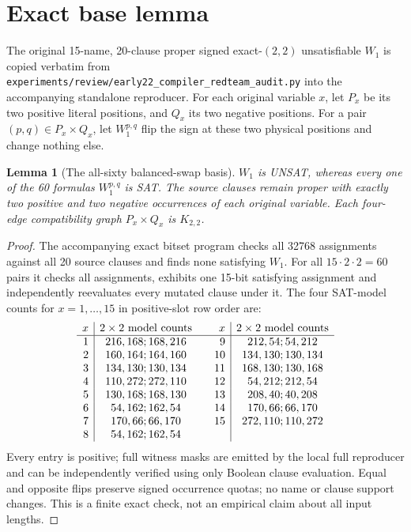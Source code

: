 \documentclass[11pt]{article}
\newtheorem{lemma}[theorem]{Lemma}
\begin{document}
\section{Exact base lemma}
The original 15-name, 20-clause proper signed exact-$(2,2)$ unsatisfiable
$W_1$ is copied verbatim from
\texttt{experiments/review/early22\_compiler\_redteam\_audit.py}
into the accompanying standalone reproducer.
For each original variable $x$, let $P_x$ be its two positive literal
positions, and $Q_x$ its two negative positions. For a pair
$(p,q)\in P_x\times Q_x$, let $W_1^{p,q}$ flip the sign at these two
physical positions and change nothing else.

\begin{lemma}[The all-sixty balanced-swap basis]
$W_1$ is UNSAT, whereas every one of the 60 formulas
$W_1^{p,q}$ is SAT. The source clauses remain proper with exactly
two positive and two negative occurrences of each original variable.
Each four-edge compatibility graph $P_x\times Q_x$ is $K_{2,2}$.
\end{lemma}
\begin{proof}
The accompanying exact bitset program checks all 32768 assignments
against all 20 source clauses and finds none satisfying $W_1$. For
all $15\cdot2\cdot2=60$ pairs it checks all assignments, exhibits one
15-bit satisfying assignment and independently reevaluates every
mutated clause under it. The four SAT-model counts for $x=1,\ldots,15$
in positive-slot row order are:
\[
\begin{array}{r|c@{\qquad}r|c}
x&2\times2\ {\rm model\ counts}&x&2\times2\ {\rm model\ counts}\\\hline
1&216,168;168,216& 9&212,54;54,212\\
2&160,164;164,160&10&134,130;130,134\\
3&134,130;130,134&11&168,130;130,168\\
4&110,272;272,110&12&54,212;212,54\\
5&130,168;168,130&13&208,40;40,208\\
6&54,162;162,54&14&170,66;66,170\\
7&170,66;66,170&15&272,110;110,272\\
8&54,162;162,54&&
\end{array}
\]
Every entry is positive; full witness masks are emitted by the
local full reproducer and can be independently verified using only
Boolean clause evaluation. Equal and opposite flips preserve signed
occurrence quotas; no name or clause support changes.
This is a finite exact check, not an empirical claim about all input
lengths.
\end{proof}
\end{document}

